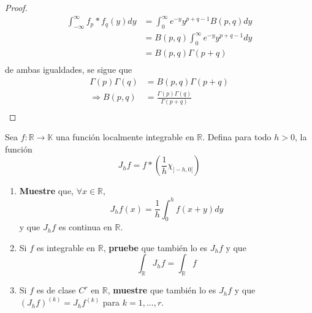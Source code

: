 \documentclass[12pt]{report}
\theoremstyle{largebreak}
\newcommand\cf[3]{\ensuremath{#1:#2\rightarrow#3}}
\begin{document}
\begin{proof}
\begin{equation*}
            \begin{split}
                \int_{-\infty}^\infty f_p*f_q(y)dy&=\int_0^\infty e^{-y}y^{ p+q-1}B(p,q)dy \\
                &=B(p,q)\int_0^\infty e^{-y}y^{ p+q-1}dy \\
                &=B(p,q)\Gamma(p+q) \\
            \end{split}
        \end{equation*}
        de ambas igualdades, se sigue que
        \begin{equation*}
            \begin{split}
                \Gamma(p)\Gamma(q)&=B(p,q)\Gamma(p+q)\\
                \Rightarrow B(p,q)&=\frac{\Gamma(p)\Gamma(q)}{\Gamma(p+q)}\\
            \end{split}
        \end{equation*}
    \end{proof}

    \begin{excer}
        Sea $\cf{f}{\mathbb{R}}{\mathbb{K}}$ una función localmente integrable en $\mathbb{R}$. Defina para todo $h>0$, la función
        \begin{equation*}
            J_hf=f*\left(\frac{1}{h}\chi_{]-h,0[}\right)
        \end{equation*}
        \begin{enumerate}
            \item \textbf{Muestre} que, $\forall x\in\mathbb{R}$,
            \begin{equation*}
                J_hf(x)=\frac{1}{h}\int_0^hf(x+y)dy
            \end{equation*}
            y que $J_hf$ es continua en $\mathbb{R}$.
            \item Si $f$ es integrable en $\mathbb{R}$, \textbf{pruebe} que también lo es $J_hf$ y que
            \begin{equation*}
                \int_\mathbb{R}J_hf=\int_{\mathbb{R}}f
            \end{equation*}
            \item Si $f$ es de clase $C^r$ en $\mathbb{R}$, \textbf{muestre} que también lo es $J_hf$ y que $\left(J_hf\right)^{(k)}=J_hf^{(k)}$ para $k=1,...,r$.
        \end{enumerate}
    \end{excer}
\end{document}

